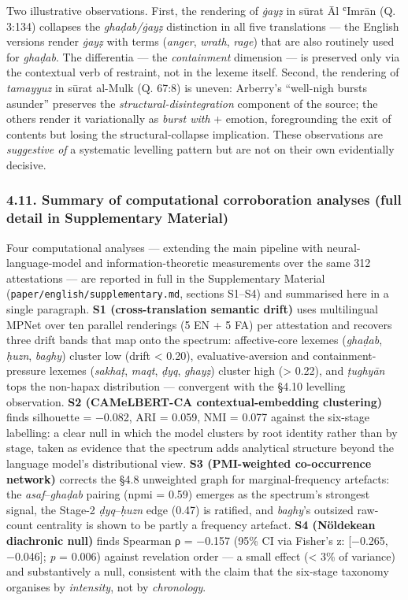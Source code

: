 Two illustrative observations. First, the rendering of \emph{ġayẓ} in
sūrat Āl ʿImrān (Q. 3:134) collapses the \emph{ghaḍab/ġayẓ} distinction
in all five translations --- the English versions render \emph{ġayẓ}
with terms (\emph{anger}, \emph{wrath}, \emph{rage}) that are also
routinely used for \emph{ghaḍab}. The differentia --- the
\emph{containment} dimension --- is preserved only via the contextual
verb of restraint, not in the lexeme itself. Second, the rendering of
\emph{tamayyuz} in sūrat al-Mulk (Q. 67:8) is uneven: Arberry's
``well-nigh bursts asunder'' preserves the
\emph{structural-disintegration} component of the source; the others
render it variationally as \emph{burst with} + emotion, foregrounding
the exit of contents but losing the structural-collapse implication.
These observations are \emph{suggestive of} a systematic levelling
pattern but are not on their own evidentially decisive.

\subsubsection{4.11. Summary of computational corroboration analyses
(full detail in Supplementary
Material)}\label{summary-of-computational-corroboration-analyses-full-detail-in-supplementary-material}

Four computational analyses --- extending the main pipeline with
neural-language-model and information-theoretic measurements over the
same 312 attestations --- are reported in full in the Supplementary
Material (\texttt{paper/english/supplementary.md}, sections S1--S4) and
summarised here in a single paragraph. \textbf{S1 (cross-translation
semantic drift)} uses multilingual MPNet over ten parallel renderings (5
EN + 5 FA) per attestation and recovers three drift bands that map onto
the spectrum: affective-core lexemes (\emph{ghaḍab}, \emph{ḥuzn},
\emph{baghy}) cluster low (drift \textless{} 0.20), evaluative-aversion
and containment-pressure lexemes (\emph{sakhaṭ}, \emph{maqt},
\emph{ḍyq}, \emph{ghayẓ}) cluster high (\textgreater{} 0.22), and
\emph{ṭughyān} tops the non-hapax distribution --- convergent with the
§4.10 levelling observation. \textbf{S2 (CAMeLBERT-CA
contextual-embedding clustering)} finds silhouette = −0.082, ARI =
0.059, NMI = 0.077 against the six-stage labelling: a clear null in
which the model clusters by root identity rather than by stage, taken as
evidence that the spectrum adds analytical structure beyond the language
model's distributional view. \textbf{S3 (PMI-weighted co-occurrence
network)} corrects the §4.8 unweighted graph for marginal-frequency
artefacts: the \emph{asaf}--\emph{ghaḍab} pairing (npmi = 0.59) emerges
as the spectrum's strongest signal, the Stage-2 \emph{ḍyq}--\emph{ḥuzn}
edge (0.47) is ratified, and \emph{baghy}'s outsized raw-count
centrality is shown to be partly a frequency artefact. \textbf{S4
(Nöldekean diachronic null)} finds Spearman ρ = −0.157 (95\% CI via
Fisher's z: {[}−0.265, −0.046{]}; \emph{p} = 0.006) against revelation
order --- a small effect (\textless{} 3\% of variance) and substantively
a null, consistent with the claim that the six-stage taxonomy organises
by \emph{intensity}, not by \emph{chronology}.

